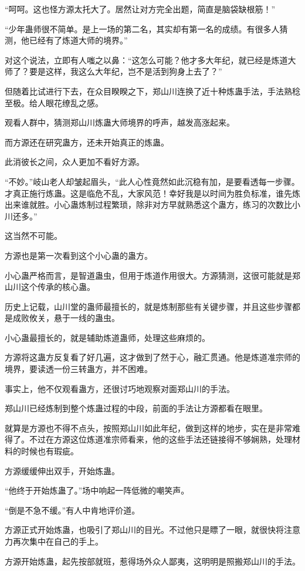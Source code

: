 \begin{this_body}
“呵呵。这也怪方源太托大了。居然让对方完全出题，简直是脑袋缺根筋！”

“少年蛊师很不简单。是上一场的第二名，其实却有第一名的成绩。有很多人猜测，他已经有了炼道大师的境界。”

对这个说法，立即有人嗤之以鼻：“这怎么可能？他才多大年纪，就已经是炼道大师了？要是这样，我这么大年纪，岂不是活到狗身上去了？”

但随着比试进行下去，在众目睽睽之下，郑山川连换了近十种炼蛊手法，手法熟稔至极。给人眼花缭乱之感。

观看人群中，猜测郑山川炼蛊大师境界的呼声，越发高涨起来。

而方源还在研究蛊方，还未开始真正的炼蛊。

此消彼长之间，众人更加不看好方源。

“不妙。”岐山老人却皱起眉头，“此人心性竟然如此沉稳有加，是要看透每一步骤。才真正施行炼蛊。这是临危不乱，大家风范！幸好我是以时间为胜负标准，谁先炼出来谁就胜。小心蛊炼制过程繁琐，除非对方早就熟悉这个蛊方，练习的次数比小川还多。”

这当然不可能。

方源也是第一次看到这个小心蛊的蛊方。

小心蛊严格而言，是智道蛊虫，但用于炼道作用很大。方源猜测，这很可能就是郑山川这个传承的核心蛊。

历史上记载，山川堂的蛊师最擅长的，就是炼制那些有关键步骤，并且这些步骤都是成败攸关，悬于一线的蛊虫。

小心蛊最擅长的，就是辅助炼道蛊师，处理这些麻烦的。

方源将这蛊方反复看了好几遍，这才做到了然于心，融汇贯通。他是炼道准宗师的境界，要读透一份三转蛊方，并不困难。

事实上，他不仅观看蛊方，还很讨巧地观察对面郑山川的手法。

郑山川已经炼制到整个炼蛊过程的中段，前面的手法让方源都看在眼里。

就算是方源也不得不点头，按照郑山川如此年纪，做到这样的地步，实在是非常难得了。不过在方源这位炼道准宗师看来，他的这些手法还链接得不够娴熟，处理材料的时候也有瑕疵。

方源缓缓伸出双手，开始炼蛊。

“他终于开始炼蛊了。”场中响起一阵低微的嘲笑声。

“倒是不急不缓。”有人中肯地评价道。

方源正式开始炼蛊，也吸引了郑山川的目光。不过他只是瞟了一眼，就很快将注意力再次集中在自己的手上。

方源开始炼蛊，起先按部就班，惹得场外众人鄙夷，这明明是照搬郑山川的手法。


\end{this_body}
